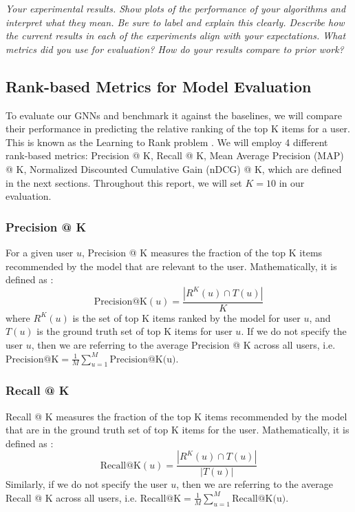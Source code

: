\documentclass{article}
\begin{document}
\textit{Your experimental results. Show plots of the performance of your algorithms and interpret what they mean. Be sure to label and explain this clearly. Describe how the current results in each of the experiments align with your expectations. What metrics did you use for evaluation? How do your results compare to prior work?}

\subsection{Rank-based Metrics for Model Evaluation}

To evaluate our GNNs and benchmark it against the baselines, we will compare their performance in predicting the relative ranking of the top K items for a user. This is known as the Learning to Rank problem \cite{learning_to_rank}. We will employ 4 different rank-based metrics: Precision @ K, Recall @ K, Mean Average Precision (MAP) @ K, Normalized Discounted Cumulative Gain (nDCG) @ K, which are defined in the next sections. Throughout this report, we will set $K = 10$ in our evaluation.

\subsubsection{Precision @ K}

For a given user $u$, Precision @ K measures the fraction of the top K items recommended by the model that are relevant to the user. Mathematically, it is defined as \cite{survey}:
$$
\mbox{Precision@K}(u) = \frac{| R^K(u) \cap T(u) |}{K}
$$
where $R^K(u)$ is the set of top K items ranked by the model for user $u$, and $T(u)$ is the ground truth set of top K items for user $u$. If we do not specify the user $u$, then we are referring to the average Precision @ K across all users, i.e. $\mbox{Precision@K} = \frac{1}{M} \sum_{u = 1}^M \mbox{Precision@K(u)}$.

\subsubsection{Recall @ K}

Recall @ K measures the fraction of the top K items recommended by the model that are in the ground truth set of top K items for the user. Mathematically, it is defined as \cite{survey}:
$$
\mbox{Recall@K}(u) = \frac{| R^K(u) \cap T(u) |}{|T(u)|}
$$
Similarly, if we do not specify the user $u$, then we are referring to the average Recall @ K across all users, i.e. $\mbox{Recall@K} = \frac{1}{M} \sum_{u = 1}^M \mbox{Recall@K(u)}$.
\end{document}
